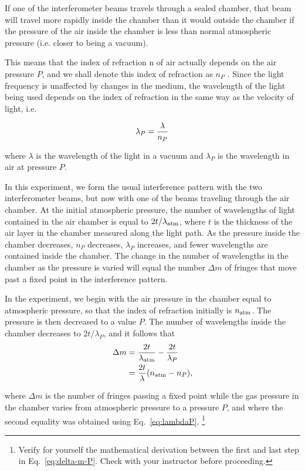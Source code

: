 If one of the interferometer beams travels through a sealed chamber, 
that beam will travel more rapidly inside the chamber than it 
would outside the chamber if the pressure of the air inside the 
chamber is less than normal atmospheric pressure (i.e. closer 
to being a vacuum).

This means that the index of refraction n of air actually depends 
on the air pressure $P$, and we shall denote this index of refraction 
as $n_P$ . Since the light frequency is unaffected by changes in 
the medium, the wavelength of the light being used depends on 
the index of refraction in the same way as the velocity of light, 
i.e.

\begin{equation}
\lambda_P = {\lambda \over n_P}
\label{eq:lambdaP}
\end{equation}

\noindent where $\lambda$ is the wavelength of the light in a vacuum and
$\lambda_P$ is the wavelength in air at pressure $P$.

In this experiment, we form the usual interference pattern with the two
interferometer beams, but now with one of the beams traveling through the air
chamber. At the initial atmospheric pressure, the number of wavelengths of light
contained in the air chamber is equal to $2t/\lambda_{\rm atm}$, where $t$ is
the thickness of the air layer in the chamber measured along the light
path. As the pressure inside
the chamber decreases, $n_P$ decreases, $\lambda_P$ increases, and fewer
wavelengths are contained inside the chamber. The change in the number of
wavelengths in the chamber as the pressure is varied will equal the number
$\Delta m$ of fringes that move past a fixed point in the interference pattern.

In the experiment, we begin with the air pressure in the chamber 
equal to atmospheric pressure, so that the index of refraction 
initially is $n_{\rm atm}$. The pressure is then decreased to a value 
$P$. The number of wavelengths inside the chamber decreases to 
$2t/\lambda_P$, and it follows that
\begin{align}
\Delta m &= \frac{2t}{\lambda_{\rm atm}} - \frac{2t}{\lambda_P} \nonumber \\ 
 &= \frac{2t}{\lambda} ( n_{\rm atm} - n_P ),
\label{eq:delta-m-P}
\end{align}

\noindent where $\Delta m$ is the number of fringes passing a fixed point while
the gas pressure in the chamber varies from atmospheric pressure to a pressure
$P$, and where the second equality was obtained using Eq.~\ref{eq:lambdaP}.
\footnote{Verify for yourself the mathematical derivation between the first and last
step in Eq.~\ref{eq:delta-m-P}. Check with your instructor before proceeding.}


